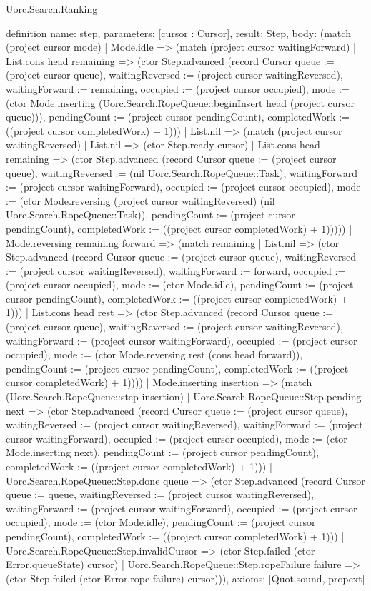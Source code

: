 \begin{lexlean}{Uorc.Search.Ranking}
\begin{semanticmodule}
definition{
  name: step,
  parameters: [cursor : Cursor],
  result: Step,
  body: (match (project cursor mode)
    | Mode.idle => (match (project cursor waitingForward)
      | List.cons head remaining => (ctor Step.advanced (record Cursor {queue := (project cursor queue), waitingReversed := (project cursor waitingReversed), waitingForward := remaining, occupied := (project cursor occupied), mode := (ctor Mode.inserting (Uorc.Search.RopeQueue::beginInsert head (project cursor queue))), pendingCount := (project cursor pendingCount), completedWork := ((project cursor completedWork) + 1)}))
      | List.nil => (match (project cursor waitingReversed)
        | List.nil => (ctor Step.ready cursor)
        | List.cons head remaining => (ctor Step.advanced (record Cursor {queue := (project cursor queue), waitingReversed := (nil Uorc.Search.RopeQueue::Task), waitingForward := (project cursor waitingForward), occupied := (project cursor occupied), mode := (ctor Mode.reversing (project cursor waitingReversed) (nil Uorc.Search.RopeQueue::Task)), pendingCount := (project cursor pendingCount), completedWork := ((project cursor completedWork) + 1)}))))
    | Mode.reversing remaining forward => (match remaining
      | List.nil => (ctor Step.advanced (record Cursor {queue := (project cursor queue), waitingReversed := (project cursor waitingReversed), waitingForward := forward, occupied := (project cursor occupied), mode := (ctor Mode.idle), pendingCount := (project cursor pendingCount), completedWork := ((project cursor completedWork) + 1)}))
      | List.cons head rest => (ctor Step.advanced (record Cursor {queue := (project cursor queue), waitingReversed := (project cursor waitingReversed), waitingForward := (project cursor waitingForward), occupied := (project cursor occupied), mode := (ctor Mode.reversing rest (cons head forward)), pendingCount := (project cursor pendingCount), completedWork := ((project cursor completedWork) + 1)})))
    | Mode.inserting insertion => (match (Uorc.Search.RopeQueue::step insertion)
      | Uorc.Search.RopeQueue::Step.pending next => (ctor Step.advanced (record Cursor {queue := (project cursor queue), waitingReversed := (project cursor waitingReversed), waitingForward := (project cursor waitingForward), occupied := (project cursor occupied), mode := (ctor Mode.inserting next), pendingCount := (project cursor pendingCount), completedWork := ((project cursor completedWork) + 1)}))
      | Uorc.Search.RopeQueue::Step.done queue => (ctor Step.advanced (record Cursor {queue := queue, waitingReversed := (project cursor waitingReversed), waitingForward := (project cursor waitingForward), occupied := (project cursor occupied), mode := (ctor Mode.idle), pendingCount := (project cursor pendingCount), completedWork := ((project cursor completedWork) + 1)}))
      | Uorc.Search.RopeQueue::Step.invalidCursor => (ctor Step.failed (ctor Error.queueState) cursor)
      | Uorc.Search.RopeQueue::Step.ropeFailure failure => (ctor Step.failed (ctor Error.rope failure) cursor))),
  axioms: [Quot.sound, propext]
}


\end{semanticmodule}
\end{lexlean}
